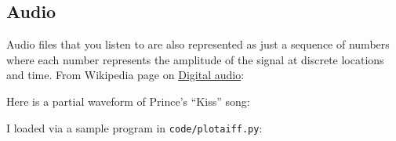 \documentclass[titlepage]{tufte-book}
\begin{document}
\begin{fullwidth}
\subsection{Audio}

Audio files that you listen to are also represented as just a sequence of numbers where each number represents the amplitude of the signal at discrete locations and time. From Wikipedia page on \href{https://en.wikipedia.org/wiki/Digital_audio}{Digital audio}:


Here is a partial waveform of Prince's ``Kiss'' song:


\noindent I loaded via a sample program in {\tt code/plotaiff.py}:


\end{fullwidth}
\end{document}

